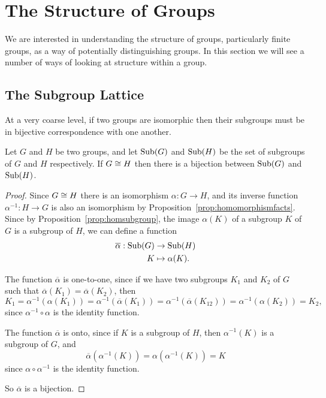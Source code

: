 \chapter{The Structure of Groups}

We are interested in understanding the structure of groups, particularly finite
groups, as a way of potentially distinguishing groups.  In this
section we will see a number of ways of looking at structure within a group.

\section{The Subgroup Lattice}

At a very coarse level, if two groups are isomorphic then their subgroups
must be in bijective correspondence with one another.

\begin{proposition}\label{prop:subgroupisom}
  Let $G$ and $H$ be two groups, and let $\operatorname{Sub}(G)$ and $\operatorname{Sub}(H)$ be the set
  of subgroups of $G$ and $H$ respectively.  If $G \cong H$ then there is a
  bijection between $\operatorname{Sub}(G)$ and $\operatorname{Sub}(H)$.
\end{proposition}
\begin{proof}
  Since $G \cong H$ there is an isomorphism $\alpha : G \to H$, and its
  inverse function $\alpha^{-1}: H \to G$ is also an isomorphism by
  Proposition~\ref{prop:homomorphismfacts}.  Since by
  Proposition~\ref{prop:homsubgroup}, the image $\alpha(K)$ of a subgroup $K$
  of $G$ is a subgroup of $H$, we can define a function
  \begin{align*}
    \overline{\alpha} : \operatorname{Sub}(G) & \to \operatorname{Sub}(H) \\
        K & \mapsto \alpha(K).
  \end{align*}
  
  The function $\overline{\alpha}$ is one-to-one, since if we have two
  subgroups $K_{1}$ and $K_{2}$ of $G$ such that $\overline{\alpha}(K_{1}) =
  \overline{\alpha}(K_{2})$, then
  \[
    K_{1} = \alpha^{-1}(\alpha(K_{1})) = \alpha^{-1}(\overline{\alpha}(K_{1})) =
    \alpha^{-1}(\overline{\alpha}(K_{12})) = \alpha^{-1}(\alpha(K_{2})) =
    K_{2},
  \]
  since $\alpha^{-1} \circ \alpha$ is the identity function.
  
  The function $\overline{\alpha}$ is onto, since if $K$ is a subgroup of
  $H$, then $\alpha^{-1}(K)$ is a subgroup of $G$, and
  \[
    \overline{\alpha}(\alpha^{-1}(K)) = \alpha(\alpha^{-1}(K)) = K
  \]
  since $\alpha \circ \alpha^{-1}$ is the identity function.
  
  So $\overline{\alpha}$ is a bijection.
\end{proof}

